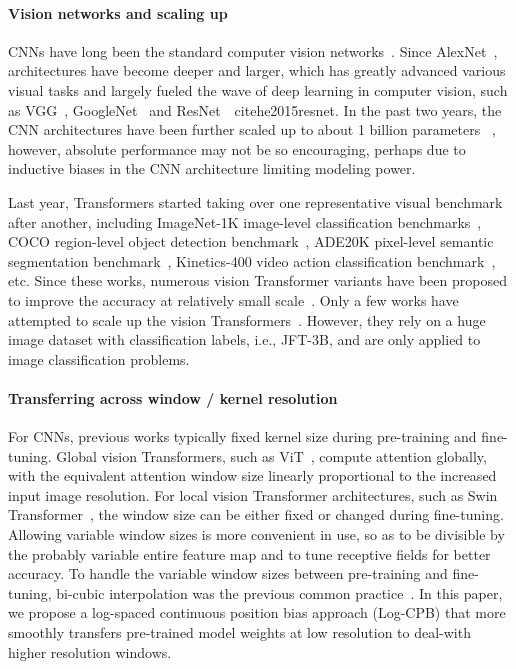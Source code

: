 \documentclass[10pt,twocolumn,letterpaper]{article}
\begin{document}
\paragraph{Vision networks and scaling up} CNNs have long been the standard computer vision networks~\cite{lecun1998lenet, krizhevsky2012alexnet}. Since AlexNet~\cite{krizhevsky2012alexnet}, architectures have become deeper and larger, which has greatly advanced various visual tasks and largely fueled the wave of deep learning in computer vision, such as VGG~\cite{simonyan2014vgg}, GoogleNet~\cite{szegedy2015googlenet} and ResNet~\ cite{he2015resnet}. In the past two years, the CNN architectures have been further scaled up to about 1 billion parameters ~\cite{kolesnikov2019bigtransfer, goyal2021selfsupervised}, however, absolute performance may not be so encouraging, perhaps due to inductive biases in the CNN architecture limiting modeling power. 

Last year, Transformers started taking over one representative visual benchmark after another, including ImageNet-1K image-level classification benchmarks~\cite{dosovitskiy2020vit}, COCO region-level object detection benchmark~\cite{liu2021swin}, ADE20K pixel-level semantic segmentation benchmark~\cite{zheng2020SETR, liu2021swin}, Kinetics-400 video action classification benchmark~\cite{arnab2021vivit}, etc. Since these works, numerous vision Transformer variants have been proposed to improve the accuracy at relatively small scale~\cite{touvron2020deit,li2021localvit,chu2021twins,wang2021pyramid,yuan2021tokenstotoken,zhang2021multiscale,dong2021cswin,yang2021focal,huang2021shuffle,xiao2021early,yuan2021volo}. 
Only a few works have attempted to scale up the vision Transformers~\cite{zhai2021scaling,riquelme2021scaling,dai2021coatnet}. However, they rely on a huge image dataset with classification labels, i.e., JFT-3B, and are only applied to image classification problems.


\paragraph{Transferring across window / kernel resolution} For CNNs, previous works typically fixed kernel size during pre-training and fine-tuning. Global vision Transformers, such as ViT~\cite{dosovitskiy2020vit}, compute attention globally, with the equivalent attention window size linearly proportional to the increased input image resolution. For local vision Transformer architectures, such as Swin Transformer~\cite{liu2021swin}, the window size can be either fixed or changed during fine-tuning. Allowing variable window sizes is more convenient in use, so as to be divisible by the probably variable entire feature map and to tune receptive fields for better accuracy. To handle the variable window sizes between pre-training and fine-tuning, bi-cubic interpolation was the previous common practice~\cite{dosovitskiy2020vit, liu2021swin}. In this paper, we propose a log-spaced continuous position bias approach (Log-CPB) that more smoothly transfers pre-trained model weights at low resolution to deal-with higher resolution windows. 
\end{document}
